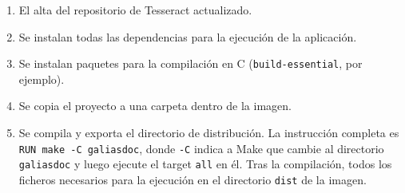 \begin{enumerate}
    \item El alta del repositorio de Tesseract actualizado.
    \item Se instalan todas las dependencias para la ejecución de la aplicación.
    \item Se instalan paquetes para la compilación en C (\verb|build-essential|, por ejemplo).
    \item Se copia el proyecto a una carpeta dentro de la imagen.
    \item Se compila y exporta el directorio de distribución. La instrucción completa es \verb|RUN make -C galiasdoc|, donde \verb|-C| indica a Make que cambie al directorio \verb|galiasdoc| y luego ejecute el target \verb|all| en él. Tras la compilación, todos los ficheros necesarios para la ejecución en el directorio \verb|dist| de la imagen.
\end{enumerate}



